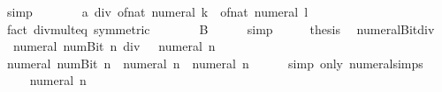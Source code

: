 \begin{isabellebody}
\ simp\isanewline
\ \ \isamarkupfalse%
\ \isamarkupfalse%
\ {\isachardoublequoteopen}{\isasymdots}\ {\isacharequal}{\kern0pt}\ a\ div\ {\isacharparenleft}{\kern0pt}of{\isacharunderscore}{\kern0pt}nat\ {\isacharparenleft}{\kern0pt}numeral\ k{\isacharparenright}{\kern0pt}\ {\isacharasterisk}{\kern0pt}\ of{\isacharunderscore}{\kern0pt}nat\ {\isacharparenleft}{\kern0pt}numeral\ l{\isacharparenright}{\kern0pt}{\isacharparenright}{\kern0pt}{\isachardoublequoteclose}\isanewline
\ \ \ \ \isamarkupfalse%
\ {\isacharparenleft}{\kern0pt}fact\ div{\isacharunderscore}{\kern0pt}mult{}{\isacharunderscore}{\kern0pt}eq{\isacharprime}{\kern0pt}\ {\isacharbrackleft}{\kern0pt}symmetric{\isacharbrackright}{\kern0pt}{\isacharparenright}{\kern0pt}\isanewline
\ \ \isamarkupfalse%
\ \isamarkupfalse%
\ {\isachardoublequoteopen}{\isasymdots}\ {\isacharequal}{\kern0pt}\ {\isacharquery}{\kern0pt}B{\isachardoublequoteclose}\isanewline
\ \ \ \ \isamarkupfalse%
\ simp\isanewline
\ \ \isamarkupfalse%
\ \isamarkupfalse%
\ {\isacharquery}{\kern0pt}thesis\ \isacommand{{\isachardot}{\kern0pt}}\isamarkupfalse%
\isanewline
{}\isamarkupfalse%
%
\endisatagproof
{\isafoldproof}%
%
\isadelimproof
\isanewline
%
\endisadelimproof
\isanewline
{}\isamarkupfalse%
\ numeral{\isacharunderscore}{\kern0pt}Bit{}{\isacharunderscore}{\kern0pt}div{\isacharunderscore}{\kern0pt}{}{\isacharcolon}{\kern0pt}\isanewline
\ \ {\isachardoublequoteopen}numeral\ {\isacharparenleft}{\kern0pt}num{\isachardot}{\kern0pt}Bit{}\ n{\isacharparenright}{\kern0pt}\ div\ {}\ {\isacharequal}{\kern0pt}\ numeral\ n{\isachardoublequoteclose}\isanewline
%
\isadelimproof
%
\endisadelimproof
%
\isatagproof
{}\isamarkupfalse%
\ {\isacharminus}{\kern0pt}\isanewline
\ \ \isamarkupfalse%
\ {\isachardoublequoteopen}numeral\ {\isacharparenleft}{\kern0pt}num{\isachardot}{\kern0pt}Bit{}\ n{\isacharparenright}{\kern0pt}\ {\isacharequal}{\kern0pt}\ numeral\ n\ {\isacharplus}{\kern0pt}\ numeral\ n{\isachardoublequoteclose}\isanewline
\ \ \ \ \isamarkupfalse%
\ {\isacharparenleft}{\kern0pt}simp\ only{\isacharcolon}{\kern0pt}\ numeral{\isachardot}{\kern0pt}simps{\isacharparenright}{\kern0pt}\isanewline
\ \ \isamarkupfalse%
\ \isamarkupfalse%
\ {\isachardoublequoteopen}{\isasymdots}\ {\isacharequal}{\kern0pt}\ numeral\ n\ {\isacharasterisk}{\kern0pt}\ {}{\isachardoublequoteclose}\isanewline

\end{isabellebody}
